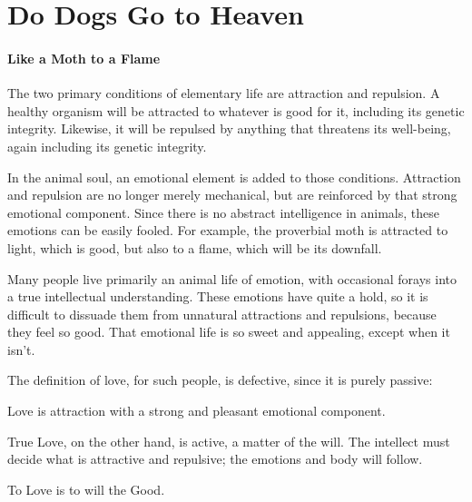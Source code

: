 \section{Do Dogs Go to Heaven}

\paragraph{Like a Moth to a Flame}

The two primary conditions of elementary life are attraction and repulsion. A healthy organism will be attracted to whatever is good for it, including its genetic integrity. Likewise, it will be repulsed by anything that threatens its well-being, again including its genetic integrity.

In the animal soul, an emotional element is added to those conditions. Attraction and repulsion are no longer merely mechanical, but are reinforced by that strong emotional component. Since there is no abstract intelligence in animals, these emotions can be easily fooled. For example, the proverbial moth is attracted to light, which is good, but also to a flame, which will be its downfall.

Many people live primarily an animal life of emotion, with occasional forays into a true intellectual understanding. These emotions have quite a hold, so it is difficult to dissuade them from unnatural attractions and repulsions, because they feel so good. That emotional life is so sweet and appealing, except when it isn't.

The definition of love, for such people, is defective, since it is purely passive:

\begin{quotex}
Love is attraction with a strong and pleasant emotional component.

\end{quotex}
True Love, on the other hand, is active, a matter of the will. The intellect must decide what is attractive and repulsive; the emotions and body will follow.

\begin{quotex}
To Love is to will the Good.

\end{quotex}

